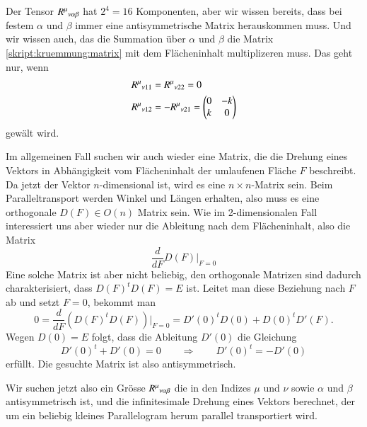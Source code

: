 Der Tensor $R^\mu\mathstrut_{\nu\alpha\beta}$ hat $2^4=16$ Komponenten,
aber wir wissen bereits, dass bei festem $\alpha$ und $\beta$
immer eine antisymmetrische Matrix herauskommen muss.
Und wir wissen auch, das die Summation über $\alpha$ und $\beta$
die Matrix \eqref{skript:kruemmung:matrix} mit dem Flächeninhalt
multiplizeren muss.
Das geht nur, wenn
\begin{align*}
R^\mu\mathstrut_{\nu11}
&=
R^\mu\mathstrut_{\nu22}=0
\\
R^\mu\mathstrut_{\nu12}
&=
-R^\mu\mathstrut_{\nu21}
=
\begin{pmatrix}0&-k\\k&0\end{pmatrix}
\end{align*}
gewält wird.

Im allgemeinen Fall suchen wir auch wieder eine Matrix, die
die Drehung eines Vektors in Abhängigkeit vom Flächeninhalt der
umlaufenen Fläche $F$ beschreibt.
Da jetzt der Vektor $n$-dimensional ist, wird es eine $n\times n$-Matrix
sein.
Beim Paralleltransport werden Winkel und Längen erhalten, also muss es
eine orthogonale $D(F)\in O(n)$ Matrix sein.
Wie im 2-dimensionalen Fall interessiert uns aber wieder nur die Ableitung
nach dem Flächeninhalt, also die Matrix
\[
\frac{d}{dF}D(F)\bigg|_{F=0}
\]
Eine solche Matrix ist aber nicht beliebig, den orthogonale Matrizen
sind dadurch charakterisiert, dass $D(F)^tD(F)=E$ ist.
Leitet man diese Beziehung nach $F$ ab und setzt $F=0$, bekommt man
\[
0
=
\frac{d}{dF}(D(F)^tD(F))\bigg|_{F=0}
=
D'(0)^t D(0) + D(0)^t D'(F).
\]
Wegen $D(0)=E$ folgt, dass die Ableitung $D'(0)$ die Gleichung
\[
D'(0)^t+D'(0)=0
\qquad\Rightarrow\qquad
D'(0)^t=-D'(0)
\]
erfüllt.
Die gesuchte Matrix ist also antisymmetrisch.

Wir suchen jetzt also ein Grösse $R^\mu\mathstrut_{\nu\alpha\beta}$
die in den Indizes $\mu$ und $\nu$ sowie $\alpha$ und $\beta$
antisymmetrisch ist, und die infinitesimale Drehung eines Vektors
berechnet, der um ein beliebig kleines Parallelogram herum parallel
transportiert wird.

